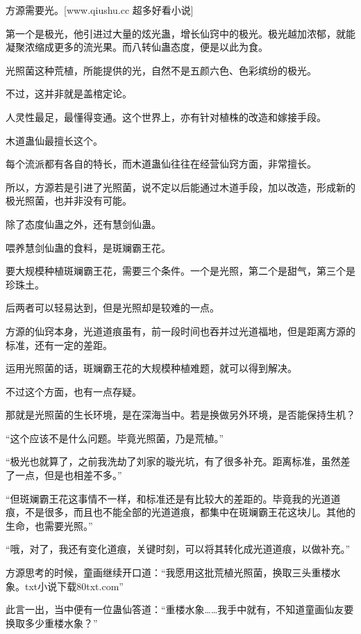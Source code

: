 
\begin{this_body}

方源需要光。[www.qiushu.cc 超多好看小说]

第一个是极光，他引进过大量的炫光蛊，增长仙窍中的极光。极光越加浓郁，就能凝聚浓缩成更多的流光果。而八转仙蛊态度，便是以此为食。

光照菌这种荒植，所能提供的光，自然不是五颜六色、色彩缤纷的极光。

不过，这并非就是盖棺定论。

人灵性最足，最懂得变通。这个世界上，亦有针对植株的改造和嫁接手段。

木道蛊仙最擅长这个。

每个流派都有各自的特长，而木道蛊仙往往在经营仙窍方面，非常擅长。

所以，方源若是引进了光照菌，说不定以后能通过木道手段，加以改造，形成新的极光照菌，也并非没有可能。

除了态度仙蛊之外，还有慧剑仙蛊。

喂养慧剑仙蛊的食料，是斑斓霸王花。

要大规模种植斑斓霸王花，需要三个条件。一个是光照，第二个是甜气，第三个是珍珠土。

后两者可以轻易达到，但是光照却是较难的一点。

方源的仙窍本身，光道道痕虽有，前一段时间也吞并过光道福地，但是距离方源的标准，还有一定的差距。

运用光照菌的话，斑斓霸王花的大规模种植难题，就可以得到解决。

不过这个方面，也有一点存疑。

那就是光照菌的生长环境，是在深海当中。若是换做另外环境，是否能保持生机？

“这个应该不是什么问题。毕竟光照菌，乃是荒植。”

“极光也就算了，之前我洗劫了刘家的璇光坑，有了很多补充。距离标准，虽然差了一点，但是也相差不多。”

“但斑斓霸王花这事情不一样，和标准还是有比较大的差距的。毕竟我的光道道痕，不是很多，而且也不能全部的光道道痕，都集中在斑斓霸王花这块儿。其他的生命，也需要光照。”

“哦，对了，我还有变化道痕，关键时刻，可以将其转化成光道道痕，以做补充。”

方源思考的时候，童画继续开口道：“我愿用这批荒植光照菌，换取三头重楼水象。txt小说下载80txt.com”

此言一出，当中便有一位蛊仙答道：“重楼水象……我手中就有，不知道童画仙友要换取多少重楼水象？”


\end{this_body}
